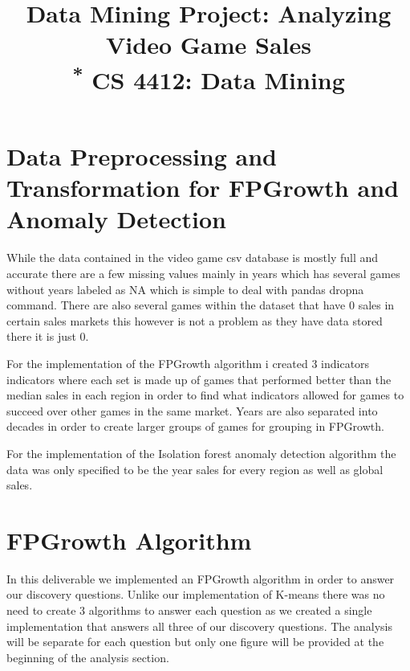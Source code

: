 \documentclass[conference]{IEEEtran}
\begin{document}
\title{Data Mining Project: Analyzing Video Game Sales\\
{\footnotesize \textsuperscript{*} CS 4412: Data Mining}

}

\author{

}
\maketitle

\section{Data Preprocessing and Transformation for FPGrowth and Anomaly Detection}
While the data contained in the video game csv database is
mostly full and accurate there are a few missing values mainly
in years which has several games without years labeled as NA
which is simple to deal with pandas dropna command. There
are also several games within the dataset that have 0 sales in
certain sales markets this however is not a problem as they
have data stored there it is just 0.

For the implementation of the FPGrowth algorithm i created 3 indicators indicators where each set is made up of games that performed better than the median sales in each region in order to find what indicators allowed for games to succeed over other games in the same market. Years are also separated into decades in order to create larger groups of games for grouping in FPGrowth.

For the implementation of the Isolation forest anomaly detection algorithm the data was only specified to be the year sales for every region as well as global sales.

\section{FPGrowth Algorithm}
In this deliverable we implemented an FPGrowth algorithm in order to answer our discovery questions. Unlike our implementation of K-means there was no need to create 3 algorithms to answer each question as we created a single implementation that answers all three of our discovery questions. The analysis will be separate for each question but only one figure will be provided at the beginning of the analysis section.
\end{document}
